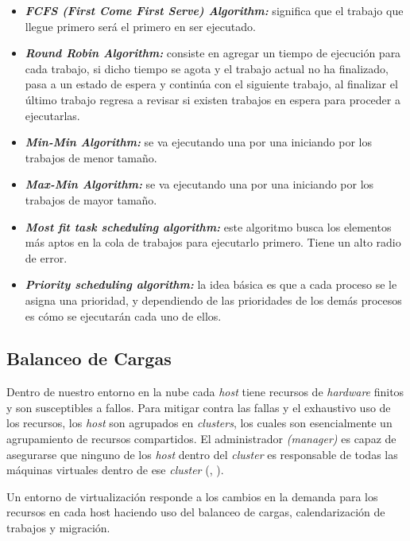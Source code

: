 \begin{itemize}
	\item \textit{\textbf{FCFS (First Come First Serve) Algorithm:}} significa que el trabajo que llegue primero ser\'a el primero en ser ejecutado.
	\item \textit{\textbf{Round Robin Algorithm:}} consiste en agregar un tiempo de ejecuci\'on para cada trabajo, si dicho tiempo se agota y el trabajo actual no ha finalizado, pasa a un estado de espera y contin\'ua con el siguiente trabajo, al finalizar el \'ultimo trabajo regresa a revisar si existen trabajos en espera para proceder a ejecutarlas. 
	\item  \textit{\textbf{Min-Min Algorithm:}} se va ejecutando una por una iniciando por los trabajos de menor tama\~no.
	\item  \textit{\textbf{Max-Min Algorithm:}} se va ejecutando una por una iniciando por los trabajos de mayor tama\~no.
	\item  \textit{\textbf{Most fit task scheduling algorithm:}} este algoritmo busca los elementos m\'as aptos en la cola de trabajos para ejecutarlo primero. Tiene un alto radio de error.
	\item \textit{\textbf{Priority scheduling algorithm:}} la idea b\'asica es que a cada proceso se le asigna una prioridad, y dependiendo de las prioridades de los dem\'as procesos es c\'omo se ejecutar\'an cada uno de ellos.
\end{itemize}

\subsection*{Balanceo de Cargas}

Dentro de nuestro entorno en la nube cada \textit{host} tiene recursos de \textit{hardware} finitos y son susceptibles a fallos. Para mitigar contra las fallas y el exhaustivo uso de los recursos, los \textit{host} son agrupados en \textit{clusters}, los cuales son esencialmente un agrupamiento de recursos compartidos. El administrador \textit{(manager)} es capaz de asegurarse que ninguno de los \textit{host} dentro del \textit{cluster} es responsable de todas las m\'aquinas virtuales dentro de ese \textit{cluster} (\citeauthor{redhat}, \citeyear{redhat}).

Un entorno de virtualizaci\'on responde a los cambios en la demanda para los recursos en cada host haciendo uso del balanceo de cargas, calendarizaci\'on de trabajos y migraci\'on.

